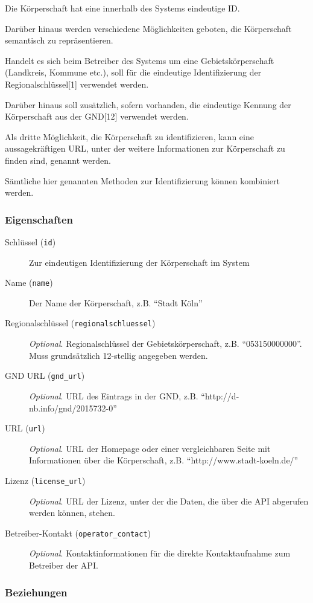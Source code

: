 \documentclass[,a4paper]{article}
\begin{document}
Die Körperschaft hat eine innerhalb des Systems eindeutige ID.

Darüber hinaus werden verschiedene Möglichkeiten geboten, die
Körperschaft semantisch zu repräsentieren.

Handelt es sich beim Betreiber des Systems um eine Gebietskörperschaft
(Landkreis, Kommune etc.), soll für die eindeutige Identifizierung der
Regionalschlüssel{[}1{]} verwendet werden.

Darüber hinaus soll zusätzlich, sofern vorhanden, die eindeutige Kennung
der Körperschaft aus der GND{[}12{]} verwendet werden.

Als dritte Möglichkeit, die Körperschaft zu identifizieren, kann eine
aussagekräftigen URL, unter der weitere Informationen zur Körperschaft
zu finden sind, genannt werden.

Sämtliche hier genannten Methoden zur Identifizierung können kombiniert
werden.

\subsubsection{Eigenschaften}

\begin{description}
\item[Schlüssel (\texttt{id})]
Zur eindeutigen Identifizierung der Körperschaft im System
\item[Name (\texttt{name})]
Der Name der Körperschaft, z.B. ``Stadt Köln''
\item[Regionalschlüssel (\texttt{regionalschluessel})]
\emph{Optional}. Regionalschlüssel der Gebietskörperschaft, z.B.
``053150000000''. Muss grundsätzlich 12-stellig angegeben werden.
\item[GND URL (\texttt{gnd\_url})]
\emph{Optional}. URL des Eintrags in der GND, z.B.
``http://d-nb.info/gnd/2015732-0''
\item[URL (\texttt{url})]
\emph{Optional}. URL der Homepage oder einer vergleichbaren Seite mit
Informationen über die Körperschaft, z.B. ``http://www.stadt-koeln.de/''
\item[Lizenz (\texttt{license\_url})]
\emph{Optional}. URL der Lizenz, unter der die Daten, die über die API
abgerufen werden können, stehen.
\item[Betreiber-Kontakt (\texttt{operator\_contact})]
\emph{Optional}. Kontaktinformationen für die direkte Kontaktaufnahme
zum Betreiber der API.
\end{description}

\subsubsection{Beziehungen}
\end{document}
